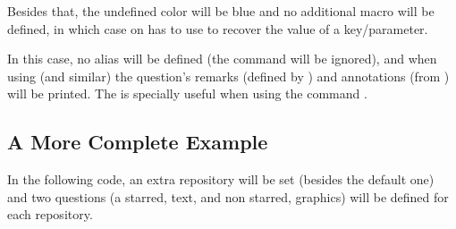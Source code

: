 \documentclass[10pt]{article}
\begin{document}
Besides that, the undefined color will be blue and no additional macro will be defined, in which case on has to use \tsobj{\QuestVal} to recover the value of a key/parameter.

\begin{codestore}
\usepackage[no alias, in review]{tikzquests}
\end{codestore}

In this case, no alias will be defined (the command  will be ignored), and when using \tsobj{\tikzQuestion} (and similar) the question's remarks (defined by ) and annotations (from \tsobj{\tikzQuestion}) will be printed. The  is specially useful when using the command \tsobj{\QuestionsList}.

\subsection{A More Complete Example}
In the following code, an extra repository will be set (besides the default one) and two questions (a starred, text, and non starred, graphics) will be defined for each repository.
\end{document}
